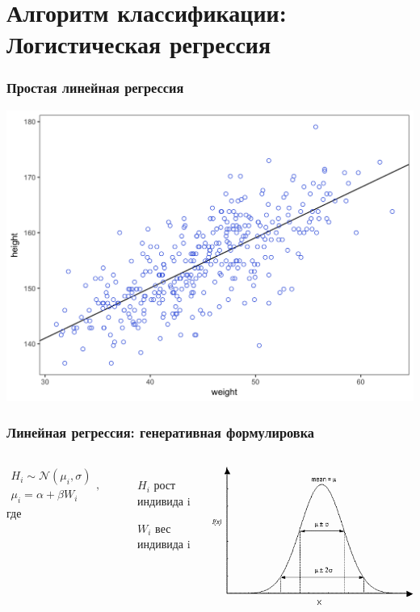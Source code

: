 \documentclass[svgnames]{beamer}
\begin{document}
\section{Алгоритм классификации: Логистическая регрессия}

\begin{frame}
  \frametitle{Простая линейная регрессия}
  \includegraphics[width=\textwidth]{lin-regression}
\end{frame}

\begin{frame}
  \frametitle{Линейная регрессия: генеративная формулировка}
  \begin{columns}
    \begin{equation}
      \begin{split}
        \label{eq:1}
        H_i \sim \mathcal{N}(\mu_i, \sigma)\\
        \mu_i = \alpha + \beta W_i
      \end{split},
    \end{equation}
    где
    \begin{itemize}
    \item[$H_i$] рост индивида i
    \item[$W_i$] вес индивида i
    \end{itemize}
    \includegraphics[width=\textwidth]{fig_dist_normal}
  \end{columns}
\end{frame}
\end{document}
